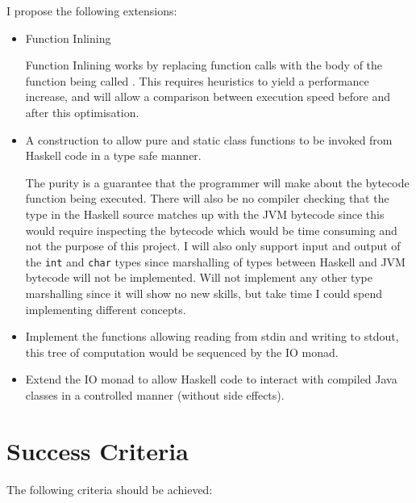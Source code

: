 \documentclass[a4paper]{article}
\begin{document}
  I propose the following extensions:

  \begin{itemize}
    \item Function Inlining

      Function Inlining works by replacing function calls with the body of the function being called \cite{ghc-inliner}.
      This requires heuristics to yield a performance increase, and will allow a comparison between execution speed before and after this optimisation.

    \item A construction to allow pure and static class functions to be invoked from Haskell code in a type safe manner.

      The purity is a guarantee that the programmer will make about the bytecode function being executed.
      There will also be no compiler checking that the type in the Haskell source matches up with the JVM bytecode since this would require inspecting the bytecode which
      would be time consuming and not the purpose of this project. I will also only support input and output of the \texttt{int} and \texttt{char} types since
      marshalling of types between Haskell and JVM bytecode will not be implemented. Will not implement any other type marshalling since it will show no new
      skills, but take time I could spend implementing different concepts.

    \item Implement the functions allowing reading from stdin and writing to stdout, this tree of computation would be sequenced by the IO monad.

    \item Extend the IO monad to allow Haskell code to interact with compiled Java classes in a controlled manner (without side effects).

  \end{itemize}

  \section*{Success Criteria}

  The following criteria should be achieved:
\end{document}
